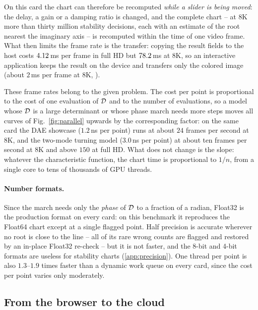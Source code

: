 On this card the chart can therefore be recomputed \emph{while a slider is
being moved}: the delay, a gain or a damping ratio is changed, and the complete
chart -- at 8K more than thirty million stability decisions, each with an
estimate of the root nearest the imaginary axis -- is recomputed within the
time of one video frame. What then limits the frame rate is the transfer:
copying the result fields to the host costs $4.12$\,ms per frame in
full HD but $78.2$\,ms at 8K, so an interactive application keeps
the result on the device and transfers only the colored image (about $2$\,ms
per frame at 8K, ).

These frame rates belong to the given problem. The cost per point is
proportional to the cost of one evaluation of $\mathcal{D}$ and to the number of
evaluations, so a model whose $\mathcal{D}$ is a large determinant or whose phase
march needs more steps moves all curves of
Fig.~\ref{fig:parallel} upwards by the corresponding factor: on the same card
the DAE showcase ($1.2$\,ns per point) runs at about $24$ frames per second at
8K, and the two-mode turning model ($3.0$\,ns per point) at about ten frames
per second at 8K and above $150$ at full HD. What does not change is the slope:
whatever the characteristic function, the chart time is proportional to $1/n$,
from a single core to tens of thousands of GPU threads.

\paragraph{Number formats.} Since the march needs only the \emph{phase} of
$\mathcal{D}$ to a fraction of a radian, Float32 is the production format on every
card: on this benchmark it reproduces the Float64 chart except at a single
flagged point. Half precision is accurate wherever no root is close to the
line -- all of its rare wrong counts are flagged and restored by an in-place
Float32 re-check -- but it is not faster, and the 8-bit and 4-bit formats are
useless for stability charts (\ref{app:precision}). One thread per point is
also $1.3$--$1.9$ times faster than a dynamic work queue on every card, since
the cost per point varies only moderately.

\subsection{From the browser to the cloud}\label{sec:parallel-cloud}

